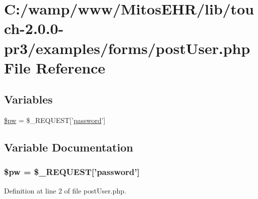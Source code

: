 \hypertarget{post_user_8php}{\section{\-C\-:/wamp/www/\-Mitos\-E\-H\-R/lib/touch-\/2.0.0-\/pr3/examples/forms/post\-User.php \-File \-Reference}
\label{post_user_8php}
}
\subsection*{\-Variables}
\begin{DoxyCompactItemize}
\item 
\hyperlink{post_user_8php_a4a84bb9d73addd9e90f2f34c36035df4}{\$pw} = \$\-\_\-\-R\-E\-Q\-U\-E\-S\-T\mbox{[}'\hyperlink{classpassword}{password}'\mbox{]}
\end{DoxyCompactItemize}


\subsection{\-Variable \-Documentation}
\hypertarget{post_user_8php_a4a84bb9d73addd9e90f2f34c36035df4}{
\subsubsection[{\$pw}]{\setlength{\rightskip}{0pt plus 5cm}\$pw = \$\-\_\-\-R\-E\-Q\-U\-E\-S\-T\mbox{[}'{\bf password}'\mbox{]}}}\label{post_user_8php_a4a84bb9d73addd9e90f2f34c36035df4}


\-Definition at line 2 of file post\-User.\-php.

